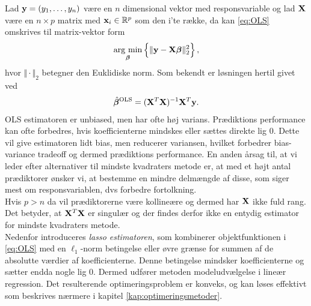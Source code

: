 Lad \(\mathbf{y}=(y_1, \ldots, y_n)\) være en \(n\) dimensional vektor med responsvariable og lad \(\mathbf{X}\) være en $n \times p$ matrix med $\mathbf{x}_i \in \mathbb{R}^p$ som den i'te række, da kan \eqref{eq:OLS} omskrives til matrix-vektor form
\begin{align*}
\argmin_{ \tbeta} \cbr{ \Vert \y - \X \tbeta \Vert_2^2},
\end{align*}
hvor \(\Vert \cdot \Vert_2\) betegner den Euklidiske norm.
Som bekendt er løsningen hertil givet ved
\begin{align*}
\hat{\boldsymbol{\beta}}^{\text{OLS}} = (\mathbf{X}^T \mathbf{X})^{-1} \mathbf{X}^T \mathbf{y}.
\end{align*}
OLS estimatoren er unbiased, men har ofte høj varians. 
Prædiktions performance kan ofte forbedres, hvis koefficienterne mindskes eller sættes direkte lig 0.
Dette vil give estimatoren lidt bias, men reducerer variansen, hvilket forbedrer bias-variance tradeoff og dermed  prædiktions performance.
En anden årsag til, at vi leder efter alternativer til mindste kvadraters metode er, at med et højt antal prædiktorer ønsker vi, at bestemme en mindre delmængde af disse, som siger mest om responsvariablen, dvs forbedre fortolkning.\\[4mm]

Hvis \(p > n\) da vil prædiktorerne være kollineære og dermed har \(\mathbf{X}\) ikke fuld rang.
Det betyder, at $\mathbf{X}^T \mathbf{X}$ er singulær og der findes derfor ikke en entydig estimator for mindste kvadraters metode. \\[4mm]
%
Nedenfor introduceres \textit{lasso estimatoren}, som kombinerer objektfunktionen i \eqref{eq:OLS} med en $\ell_1$-norm betingelse eller øvre grænse for summen af de absolutte værdier af koefficienterne.
Denne betingelse mindsker koefficienterne og sætter endda nogle lig 0. 
Dermed udfører metoden modeludvælgelse i lineær regression.
Det resulterende optimeringsproblem er konveks, og kan løses effektivt som beskrives nærmere i kapitel \ref{kap:optimeringsmetoder}.
%




%